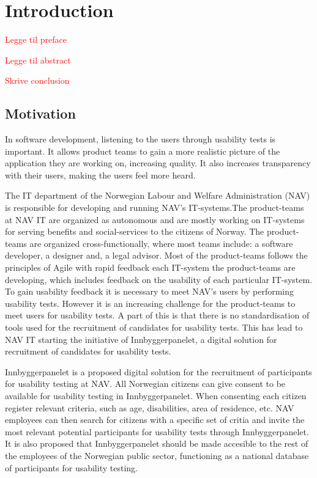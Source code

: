 \section{Introduction}

\textcolor{red}{Legge til preface}

\textcolor{red}{Legge til abstract}

\textcolor{red}{Skrive conclusion}

\subsection{Motivation}
In software development, listening to the users through usability tests is important. It allows product teams to gain a more realistic picture of the application they are working on, increasing quality. It also increases transparency with their users, making the users feel more heard. 

The IT department of the Norwegian Labour and Welfare Administration (NAV) is responsible for developing and running NAV's IT-systems.The product-teams at NAV IT are organized as autonomous and are mostly working on IT-systems for serving benefits and social-services to the citizens of Norway. The product-teams are organized cross-functionally, where most teams include: a software developer, a designer and, a legal advisor. Most of the product-teams follows the principles of Agile with rapid feedback each IT-system the product-teams are developing, which includes feedback on the usability of each particular IT-system. To gain usability feedback it is necessary to meet NAV's users by performing usability tests. However it is an increasing challenge for the product-teams to meet users for usability tests. A part of this is that there is no standardisation of tools used for the recruitment of candidates for usability tests. This has lead to NAV IT starting the initiative of Innbyggerpanelet, a digital solution for recruitment of candidates for usability tests.

Innbyggerpanelet is a proposed digital solution for the recruitment of participants for usability testing at NAV. All Norwegian citizens can give consent to be available for usability testing in Innbyggerpanelet. When consenting each citizen register relevant criteria, such as age, disabilities, area of residence, etc. NAV employees can then search for citizens with a specific set of critia and invite the most relevant potential participants for usability tests through Innbyggerpanelet. It is also proposed that Innbyggerpanelet should be made accesible to the rest of the employees of the Norwegian public sector, functioning as a national database of participants for usability testing.

